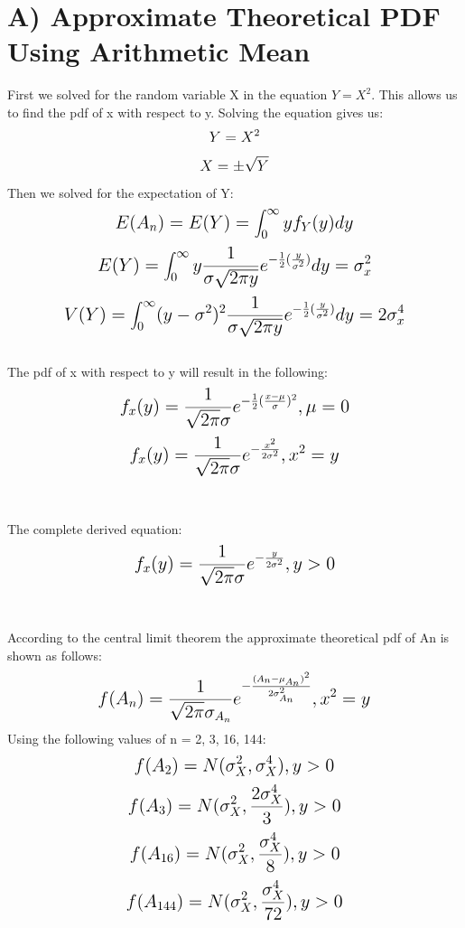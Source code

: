 \documentclass{article}
\begin{document}
\section*{A) Approximate Theoretical PDF Using Arithmetic Mean}
First we solved for the random variable X in the equation $Y = X^2$. This allows us to find the pdf of x with respect to y. Solving the equation gives us:
\[
\mathlarger{Y = X^2}
\]
\[
\mathlarger{X = \pm\sqrt{Y}}
\]
Then we solved for the expectation of Y:
\[
\mathlarger{\mathlarger{E(A_n) = E(Y) = \int_{0}^{\infty} yf_Y (y)dy}}
\]
\[
\mathlarger{\mathlarger{E(Y) = \int_{0}^{\infty}y\frac{1}{\sigma\sqrt{2\pi y}}e^{-\frac{1}{2}(\frac{y}{\sigma^2})}dy = \sigma_x^2}}
\]
\[
\mathlarger{\mathlarger{V(Y) = \int_{0}^{\infty}(y-\sigma^2)^2\frac{1}{\sigma\sqrt{2\pi y}}e^{-\frac{1}{2}(\frac{y}{\sigma^2})}dy = 2\sigma_x^4}}
\]
\\
The pdf of x with respect to y will result in the following:
\[
\mathlarger{\mathlarger{f_x(y) = \frac{1}{\sqrt{2\pi}\sigma}e^{-\frac{1}{2}(\frac{x-\mu}{\sigma})^2}, \mu = 0}}
\]
\[
\mathlarger{\mathlarger{f_x(y) = \frac{1}{\sqrt{2\pi}\sigma}e^{-\frac{x^2}{2\sigma^2}}, x^2 = y}}
\]\\\\
The complete derived equation:
\[
\mathlarger{\mathlarger{f_x(y) = \frac{1}{\sqrt{2\pi}\sigma}e^{-\frac{y}{2\sigma^2}}, y > 0}}
\]
\\\\
According to the central limit theorem the approximate theoretical pdf of An is shown as follows:
\[
\mathlarger{\mathlarger{f(A_n) = \frac{1}{\sqrt{2\pi}\sigma_{A_n}}e^{-\frac{(A_n-\mu_{A_n})^2}{2\sigma_{A_n}^2}}, x^2 = y}}
\]
Using the following values of n = 2, 3, 16, 144:
\[
\mathlarger{\mathlarger{f(A_2)=N(\sigma_X^2,\sigma_X^4),y > 0}}
\]
\[
\mathlarger{\mathlarger{f(A_3)=N(\sigma_X^2,\frac{2\sigma_X^4}{3}),y > 0}}
\]
\[
\mathlarger{\mathlarger{f(A_{16})=N(\sigma_X^2,\frac{\sigma_X^4}{8}),y > 0}}
\]
\[
\mathlarger{\mathlarger{f(A_{144})=N(\sigma_X^2,\frac{\sigma_X^4}{72}),y > 0}}
\]

\newpage
\vspace*{1cm}
\end{document}
